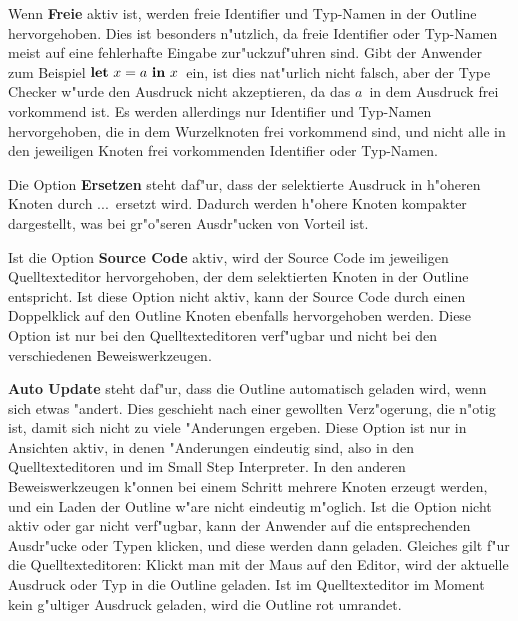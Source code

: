 Wenn {\bf Freie} aktiv ist, werden freie Identifier und Typ-Namen in der
Outline hervorgehoben. Dies ist besonders n"utzlich, da freie Identifier
oder Typ-Namen meist auf eine fehlerhafte Eingabe zur"uckzuf"uhren sind.
Gibt der Anwender zum Beispiel \glqq$\textbf{let}\ x = a\ \textbf{in}\ x$\grqq\ ein, ist 
dies nat"urlich nicht falsch, aber der Type Checker w"urde den Ausdruck
nicht akzeptieren, da das \glqq$a$\grqq\ in dem Ausdruck frei 
vorkommend ist. Es werden allerdings nur Identifier und Typ-Namen
hervorgehoben, die in dem Wurzelknoten frei vorkommend sind, und nicht
alle in den jeweiligen Knoten frei vorkommenden Identifier oder Typ-Namen.

Die Option {\bf Ersetzen} steht daf"ur, dass der selektierte Ausdruck
in h"oheren Knoten durch \glqq...\grqq\ ersetzt wird. Dadurch
werden h"ohere Knoten kompakter dargestellt, was bei gr"o"seren Ausdr"ucken
von Vorteil ist.

Ist die Option {\bf Source Code} aktiv, wird der Source Code im jeweiligen
Quelltexteditor hervorgehoben, der dem selektierten Knoten in der Outline
entspricht. Ist diese Option nicht aktiv, kann der Source Code durch einen
Doppelklick auf den Outline Knoten ebenfalls hervorgehoben werden. Diese
Option ist nur bei den Quelltexteditoren verf"ugbar und nicht bei den
verschiedenen Beweiswerkzeugen.

{\bf Auto Update} steht daf"ur, dass die Outline automatisch geladen wird,
wenn sich etwas "andert. Dies geschieht nach einer gewollten Verz"ogerung,
die n"otig ist, damit sich nicht zu viele "Anderungen ergeben. Diese Option
ist nur in Ansichten aktiv, in denen "Anderungen eindeutig sind, also in den
Quelltexteditoren und im Small Step Interpreter. In den anderen
Beweiswerkzeugen k"onnen bei einem Schritt mehrere Knoten erzeugt werden,
und ein Laden der Outline w"are nicht eindeutig m"oglich.
Ist die Option nicht aktiv oder gar nicht verf"ugbar, kann der Anwender auf 
die entsprechenden Ausdr"ucke oder Typen klicken, und diese werden dann geladen.
Gleiches gilt f"ur die Quelltexteditoren: Klickt man mit der Maus auf den
Editor, wird der aktuelle Ausdruck oder Typ in die Outline geladen. Ist im
Quelltexteditor im Moment kein g"ultiger Ausdruck geladen, wird die Outline
rot umrandet.


